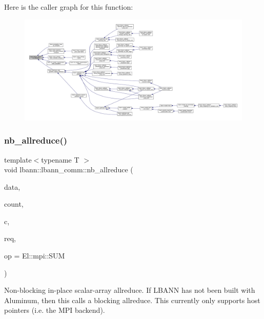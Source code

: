 Here is the caller graph for this function\+:\nopagebreak
\begin{figure}[H]
\begin{center}
\leavevmode
\includegraphics[width=350pt]{classlbann_1_1lbann__comm_a2a7bb6cf3707366fc0671d8894ca30ea_icgraph}
\end{center}
\end{figure}
\mbox{\label{classlbann_1_1lbann__comm_afb144a99e0cd2241f5fb05cad68b1f08}} 
\subsubsection{\texorpdfstring{nb\+\_\+allreduce()}{nb\_allreduce()}\hspace{0.1cm}{\footnotesize\ttfamily [2/2]}}
{\footnotesize\ttfamily template$<$typename T $>$ \\
void lbann\+::lbann\+\_\+comm\+::nb\+\_\+allreduce (\begin{DoxyParamCaption}\item[{T $\ast$}]{data,  }\item[{int}]{count,  }\item[{const El\+::mpi\+::\+Comm}]{c,  }\item[{\hyperlink{structlbann_1_1Al_1_1request}{Al\+::request} \&}]{req,  }\item[{El\+::mpi\+::\+Op}]{op = {\ttfamily El\+:\+:mpi\+:\+:SUM} }\end{DoxyParamCaption})\hspace{0.3cm}{\ttfamily [inline]}}

Non-\/blocking in-\/place scalar-\/array allreduce. If L\+B\+A\+NN has not been built with Aluminum, then this calls a blocking allreduce. This currently only supports host pointers (i.\+e. the M\+PI backend). 

